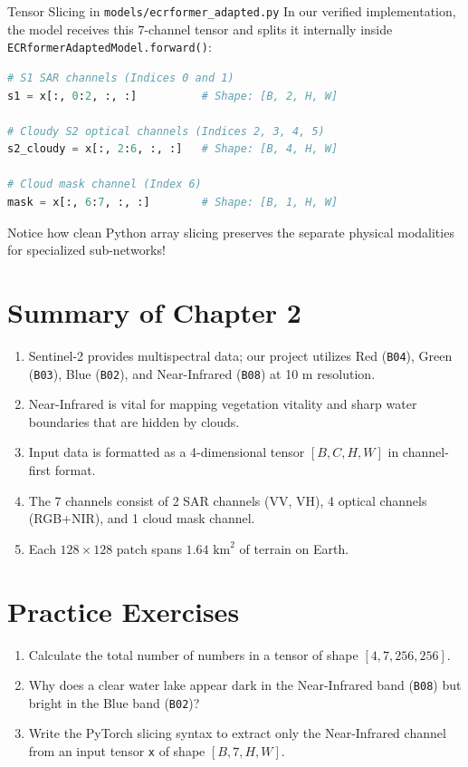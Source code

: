 \begin{codebox}{Tensor Slicing in \texttt{models/ecrformer\_adapted.py}}
In our verified implementation, the model receives this 7-channel tensor and splits it internally inside \texttt{ECRformerAdaptedModel.forward()}:
\begin{lstlisting}[language=Python]
# S1 SAR channels (Indices 0 and 1)
s1 = x[:, 0:2, :, :]          # Shape: [B, 2, H, W]

# Cloudy S2 optical channels (Indices 2, 3, 4, 5)
s2_cloudy = x[:, 2:6, :, :]   # Shape: [B, 4, H, W]

# Cloud mask channel (Index 6)
mask = x[:, 6:7, :, :]        # Shape: [B, 1, H, W]
\end{lstlisting}
Notice how clean Python array slicing preserves the separate physical modalities for specialized sub-networks!
\end{codebox}

\section{Summary of Chapter 2}
\begin{enumerate}
    \item Sentinel-2 provides multispectral data; our project utilizes Red (\texttt{B04}), Green (\texttt{B03}), Blue (\texttt{B02}), and Near-Infrared (\texttt{B08}) at 10 m resolution.
    \item Near-Infrared is vital for mapping vegetation vitality and sharp water boundaries that are hidden by clouds.
    \item Input data is formatted as a 4-dimensional tensor $[B, C, H, W]$ in channel-first format.
    \item The 7 channels consist of 2 SAR channels (VV, VH), 4 optical channels (RGB+NIR), and 1 cloud mask channel.
    \item Each $128 \times 128$ patch spans $1.64\text{ km}^2$ of terrain on Earth.
\end{enumerate}

\section{Practice Exercises}
\begin{enumerate}
    \item Calculate the total number of numbers in a tensor of shape $[4, 7, 256, 256]$.
    \item Why does a clear water lake appear dark in the Near-Infrared band (\texttt{B08}) but bright in the Blue band (\texttt{B02})?
    \item Write the PyTorch slicing syntax to extract only the Near-Infrared channel from an input tensor \texttt{x} of shape $[B, 7, H, W]$.
\end{enumerate}

